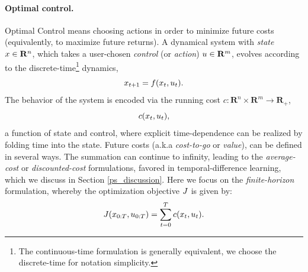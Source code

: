 \paragraph{Optimal control.}
Optimal Control means choosing actions in order to minimize future costs (equivalently, to maximize future returns). A dynamical system with \emph{state} ${x} \in \mathbf{R}^n$, which takes a user-chosen \emph{control} (or \emph{action}) ${u} \in \mathbf{R}^m$, evolves according to the discrete-time\footnote{The continuous-time formulation is generally equivalent, we choose the discrete-time for notation simplicity.} dynamics,
\begin{equation}
	{x}_{t+1} = f({x}_t, {u}_t). 
	\label{ps_dynamics}
\end{equation}
The behavior of the system is encoded via the running cost $c : \mathbf{R}^n \times \mathbf{R}^m \rightarrow \mathbf{R}_+$, 
\begin{equation}
	{c}({x}_t, {u}_t),
\end{equation}
a function of state and control, where explicit time-dependence can be realized by folding time into the state. Future costs (a.k.a \emph{cost-to-go} or \emph{value}), can be defined in several ways. The summation can continue to infinity, leading to the \emph{average-cost} or \emph{discounted-cost} formulations, favored in temporal-difference learning, which we discuss in Section \ref{ps_discussion}. Here we focus on the \emph{finite-horizon} formulation, whereby the optimization objective ${J}$ is given by:
\begin{equation}
	{J}({x}_{0:T}, {u}_{0:T}) = \sum_{t=0}^{T} {c}({x}_t, {u}_t). \label{ps_objective}
\end{equation}

